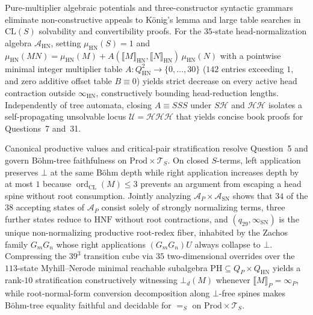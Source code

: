 \documentclass[11pt,reqno]{amsart}
\numberwithin{equation}{section}
\theoremstyle{plain}
\theoremstyle{definition}
\theoremstyle{remark}
\DeclareMathOperator{\ord}{ord}
\newcommand{\CLS}{\mathrm{CL}(S)}
\newcommand{\TS}{\mathcal{T}_S}
\newcommand{\HNF}{\mathrm{HNF}}
\newcommand{\SN}{\mathrm{SN}}
\newcommand{\HN}{\mathrm{HN}}
\newcommand{\Prod}{\mathrm{Prod}}
\newcommand{\sem}[1]{\llbracket #1 \rrbracket}
\newcommand{\convS}{=_S}
\begin{document}
Pure-multiplier algebraic potentials and three-constructor syntactic grammars eliminate non-constructive appeals to K\"onig's lemma and large table searches in $\CLS$ solvability and convertibility proofs. For the $35$-state head-normalization algebra $\mathcal{A}_{\HN}$, setting $\mu_{\HN}(S) = 1$ and $\mu_{\HN}(M N) = \mu_{\HN}(M) + A(\sem{M}_{\HN}, \sem{N}_{\HN})\,\mu_{\HN}(N)$ with a pointwise minimal integer multiplier table $A \colon Q_{\HN}^2 \to \{0,\dots,30\}$ ($142$ entries exceeding $1$, and zero additive offset table $B \equiv 0$) yields strict decrease on every active head contraction outside $\infty_{\HN}$, constructively bounding head-reduction lengths. Independently of tree automata, closing $A \equiv S S S$ under $S \mathcal{H}$ and $\mathcal{H}\mathcal{H}$ isolates a self-propagating unsolvable locus $\mathcal{U} = \mathcal{H}\mathcal{H}\mathcal{H}$ that yields concise book proofs for Questions~7 and~31.

Canonical productive values and critical-pair stratification resolve Question~5 and govern B\"ohm-tree faithfulness on $\Prod \times \TS$. On closed $S$-terms, left application preserves $\bot$ at the same B\"ohm depth while right application increases depth by at most $1$ because $\ord_{\mathrm{CL}}(M) \le 3$ prevents an argument from escaping a head spine without root consumption. Jointly analyzing $\mathcal{A}_P \times \mathcal{A}_{\SN}$ shows that $34$ of the $38$ accepting states of $\mathcal{A}_P$ consist solely of strongly normalizing terms, three further states reduce to $\HNF$ without root contractions, and $(q_{29}, \infty_{\SN})$ is the unique non-normalizing productive root-redex fiber, inhabited by the Zachos family $G_m G_n$ whose right applications $(G_m G_n) U$ always collapse to $\bot$. Compressing the $39^3$ transition cube via $35$ two-dimensional overrides over the $113$-state Myhill--Nerode minimal reachable subalgebra $\mathrm{PH} \subseteq Q_P \times Q_{\HN}$ yields a rank-$10$ stratification constructively witnessing $\bot_d(M)$ whenever $\sem{M}_P = \infty_P$, while root-normal-form conversion decomposition along $\bot$-free spines makes B\"ohm-tree equality faithful and decidable for $\convS$ on $\Prod \times \TS$.
\end{document}
